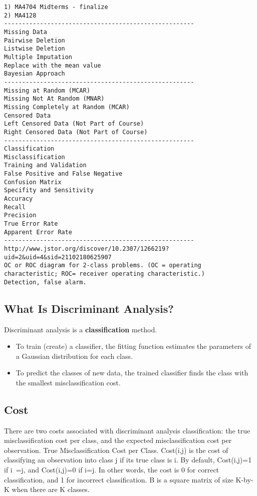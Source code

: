 \documentclass[12pt]{article} %
\begin{document}
\newpage
\begin{verbatim}
1) MA4704 Midterms - finalize
2) MA4128
-----------------------------------------------------
Missing Data
Pairwise Deletion
Listwise Deletion
Multiple Imputation
Replace with the mean value
Bayesian Approach 
-----------------------------------------------------
Missing at Random (MCAR)
Missing Not At Random (MNAR)
Missing Completely at Random (MCAR)
Censored Data
Left Censored Data (Not Part of Course)
Right Censored Data (Not Part of Course)
-----------------------------------------------------
Classification
Misclassification
Training and Validation
False Positive and False Negative
Confusion Matrix
Specifity and Sensitivity
Accuracy
Recall
Precision
True Error Rate
Apparent Error Rate
-----------------------------------------------------
http://www.jstor.org/discover/10.2307/1266219?uid=2&uid=4&sid=21102180625907
OC or ROC diagram for 2-class problems. (OC = operating characteristic; ROC= receiver operating characteristic.)
Detection, false alarm.
\end{verbatim}
\newpage
\subsection{What Is Discriminant Analysis?}
Discriminant analysis is a \textbf{classification} method. 
\begin{itemize}
\item To train (create) a classifier, the fitting function estimates the parameters of a Gaussian distribution for each class.
\item To predict the classes of new data, the trained classifier finds the class with the smallest misclassification cost.
\end{itemize}

\subsection*{Cost}
There are two costs associated with discriminant analysis classification: the true misclassification cost per class, and the expected misclassification cost per observation.
True Misclassification Cost per Class.  Cost(i,j) is the cost of classifying an observation into class j if its true class is i. 
By default, Cost(i,j)=1 if i~=j, and Cost(i,j)=0 if i=j. 
In other words, the cost is 0 for correct classification, and 1 for incorrect classification.
B is a square matrix of size K-by-K when there are K classes. 
\end{document}
